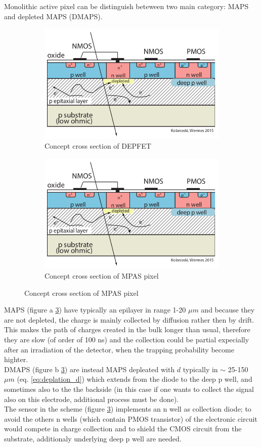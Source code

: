    Monolithic active pixel can be distinguish beteween two main category: MAPS and depleted
   MAPS (DMAPS).
   \begin{figure}
      \begin{subfigure}{.5\textwidth}
      \centering
      \includegraphics[width=.6\linewidth]{figures/Pixel_detectors/MAPS_scheme.png}
      \caption{Concept cross section of DEPFET}
      \label{fig:DEPFET_scheme}
      \end{subfigure}%
      \begin{subfigure}{.5\textwidth}
      \centering
      \includegraphics[width=.8\linewidth]{figures/Pixel_detectors/MAPS_scheme.png}
      \caption{Concept cross section of MPAS pixel}
      \label{fig:MAPS_scheme}
      \end{subfigure}
   \end{figure}

   MAPS (figure a \ref{fig:MAPS_scheme}) have typically an epilayer in range 1-20 $\mu m$ and because they are not depleted, the charge is mainly collected by diffusion rather then by drift. This makes the path of charges created in the bulk longer than usual, therefore they are slow (of order of 100 ns) and the collection could be partial expecially after an irradiation of the detector, when the trapping probability become highter. \\
   DMAPS (figure b \ref{fig:MAPS_scheme}) are instead MAPS depleated with $d$ typically in $\sim$ 25-150 $\mu m$ (eq. \ref{eq:deplation_d}) which extends from the diode to the deep p well, and sometimes also to the the backside (in this case if one wants to collect the signal also on this electrode, additional process must be done).\\
   The sensor in the scheme  (figure \ref{fig:MAPS_scheme}) implements an n well as  collection diode; to avoid the others n wells (which contain PMOS transistor) of the electronic circuit would compete in charge collection and to shield the CMOS circuit from the substrate, additionaly underlying deep p well are needed.

